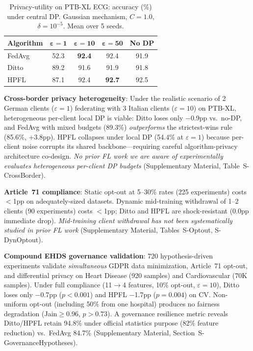 \documentclass[conference]{IEEEtran}
\begin{document}
\begin{table}[htbp]
\centering
\caption{Privacy-utility on PTB-XL ECG: accuracy (\%) under central DP. Gaussian mechanism, $C{=}1.0$, $\delta{=}10^{-5}$. Mean over 5 seeds.}
\label{tab:dp_mini}
\small
\begin{tabular}{lcccc}
\toprule
\textbf{Algorithm} & $\boldsymbol{\varepsilon{=}1}$ & $\boldsymbol{\varepsilon{=}10}$ & $\boldsymbol{\varepsilon{=}50}$ & \textbf{No DP} \\
\midrule
FedAvg & 52.3 & \textbf{92.4} & 92.4 & 91.9 \\
Ditto & 89.2 & 91.6 & 91.9 & 91.8 \\
HPFL & 87.1 & 92.4 & \textbf{92.7} & 92.5 \\
\bottomrule
\end{tabular}
\end{table}

\textbf{Cross-border privacy heterogeneity}: Under the realistic scenario of 2 German clients ($\varepsilon{=}1$) federating with 3 Italian clients ($\varepsilon{=}10$) on PTB-XL, heterogeneous per-client local DP is viable: Ditto loses only $-$0.9pp vs.\ no-DP, and FedAvg with mixed budgets (89.3\%) \textit{outperforms} the strictest-wins rule (85.6\%, $+$3.8pp). HPFL collapses under local DP (54.4\% at $\varepsilon{=}1$) because per-client noise corrupts its shared backbone---requiring careful algorithm-privacy architecture co-design. \textit{No prior FL work we are aware of experimentally evaluates heterogeneous per-client DP budgets} (Supplementary Material, Table~S-CrossBorder).

\textbf{Article~71 compliance}: Static opt-out at 5--30\% rates (225 experiments) costs $<$1pp on adequately-sized datasets. Dynamic mid-training withdrawal of 1--2 clients (90 experiments) costs $<$1pp; Ditto and HPFL are shock-resistant (0.0pp immediate drop). \textit{Mid-training client withdrawal has not been systematically studied in prior FL work} (Supplementary Material, Tables~S-Optout, S-DynOptout).

\textbf{Compound EHDS governance validation}: 720 hypothesis-driven experiments validate \textit{simultaneous} GDPR data minimization, Article~71 opt-out, and differential privacy on Heart Disease (920 samples) and Cardiovascular (70K samples). Under full compliance (11$\to$4 features, 10\% opt-out, $\varepsilon{=}10$), Ditto loses only $-$0.7pp ($p{<}0.001$) and HPFL $-$1.7pp ($p{=}0.004$) on CV. Non-uniform opt-out (including 50\% from one hospital) produces no fairness degradation (Jain$\geq$0.96, $p{>}0.73$). A governance resilience metric reveals Ditto/HPFL retain 94.8\% under official statistics purpose (82\% feature reduction) vs.\ FedAvg 84.7\% (Supplementary Material, Section~S-GovernanceHypotheses).
\end{document}
